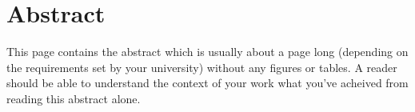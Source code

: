 \chapter*{\centering Abstract}
{}

This page contains the abstract which is usually about a page long (depending on
the requirements set by your university) without any figures or tables. A reader
should be able to understand the context of your work what you've acheived from
reading this abstract alone.

